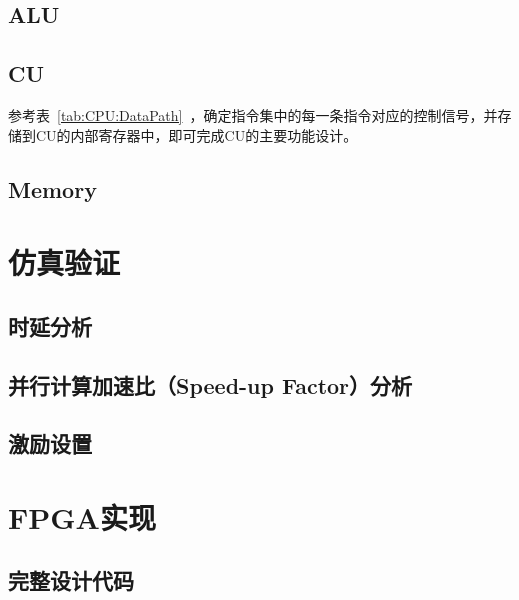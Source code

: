 \documentclass[lang=cn,a4paper,newtx]{elegantpaper}
\begin{document}
\subsection{ALU}

\subsection{CU}
参考表~\ref{tab:CPU:DataPath}~，确定指令集中的每一条指令对应的控制信号，并存储到CU的内部寄存器中，即可完成CU的主要功能设计。


\subsection{Memory}




\section{仿真验证}
\subsection{时延分析}
\subsection{并行计算加速比（Speed-up Factor）分析}
\subsection{激励设置}

\section{FPGA实现}
\newpage
\addappheadtotoc
\begin{appendices}
  \section{完整设计代码}
\end{appendices}
\end{document}

